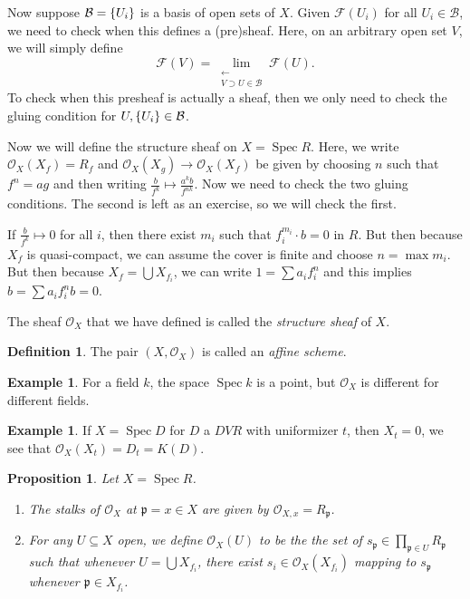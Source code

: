 \documentclass[leqno, openany]{memoir}
\newtheorem{prop}[thm]{Proposition}
\theoremstyle{definition}
\newtheorem{defn}[thm]{Definition}
\newtheorem{exm}[thm]{Example}
\theoremstyle{remark}
\theoremstyle{plain}
\theoremstyle{definition}
\theoremstyle{remark}
\newcommand{\mc}[1]{\mathcal{#1}}
\newcommand{\mf}[1]{\mathfrak{#1}}
\DeclareMathOperator{\Spec}{Spec}
\begin{document}
Now suppose $\mc{B} = \qty{U_i}$ is a basis of open sets of $X$. Given
$\mc{F}(U_i)$ for all $U_i \in \mc{B}$, we need to check when this defines a
(pre)sheaf. Here, on an arbitrary open set $V$, we will simply define \[
\mc{F}(V) = \lim_{\substack{\longleftarrow \\ V \supset U \in \mc{B}}}
\mc{F}(U). \] To check when this presheaf is actually a sheaf, then we only
need to check the gluing condition for $U, \qty{U_i} \in \mathcal{B}$.

Now we will define the structure sheaf on $X = \Spec R$. Here, we write
$\mc{O}_X(X_f) = R_f$ and $\mc{O}_X(X_g) \to \mc{O}_X(X_f)$ be given by
choosing $n$ such that $f^n = ag$ and then writing $\frac{b}{f^k} \mapsto
\frac{a^k b}{f^{nk}}$. Now we need to check the two gluing conditions. The
second is left as an exercise, so we will check the first.

If $\frac{b}{f^k} \mapsto 0$ for all $i$, then there exist $m_i$ such that
$f_i^{m_i} \cdot b = 0$ in $R$. But then because $X_f$ is quasi-compact, we can
assume the cover is finite and choose $n = \max m_i$. But then because $X_f =
\bigcup X_{f_i}$, we can write $1 = \sum a_i f_i^n$ and this implies $b = \sum
a_i f_i^n b = 0$.

The sheaf $\mc{O}_X$ that we have defined is called the \textit{structure
sheaf} of $X$.

\begin{defn} The pair $(X, \mc{O}_X)$ is called an \textit{affine scheme}.
\end{defn}

\begin{exm} For a field $k$, the space $\Spec k$ is a point, but $\mc{O}_X$ is
different for different fields.  \end{exm}

\begin{exm} If $X = \Spec D$ for $D$ a $DVR$ with uniformizer $t$, then $X_t =
\qty{0}$, we see that $\mc{O}_X(X_t) = D_t = K(D)$.  \end{exm}

\begin{prop} Let $X = \Spec R$.  \begin{enumerate} \item The stalks of
    $\mc{O}_X$ at $\mf{p} = x \in X$ are given by $\mc{O}_{X,x} = R_{\mf{p}}$.
\item For any $U \subseteq X$ open, we define $\mc{O}_X(U)$ to be the the set
    of $s_{\mf{p}} \in \prod_{\mf{p} \in U} R_{\mf{p}}$ such that whenever $U =
    \bigcup X_{f_i}$, there exist $s_i \in \mc{O}_X(X_{f_i})$ mapping to
    $s_{\mf{p}}$ whenever $\mf{p} \in X_{f_i}$.  \end{enumerate} \end{prop}
\end{document}
